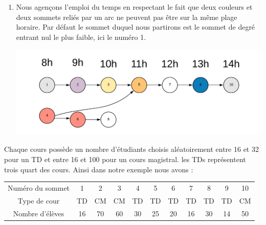 \documentclass[a4paper,11pt]{article}
\begin{document}
\begin{enumerate}
			\item Nous agençons l'emploi du temps en respectant le fait que deux couleurs et deux sommets reliés par un arc ne peuvent pas être sur la même plage horaire. Par défaut le sommet duquel nous partirons est le sommet de degré entrant nul le plus faible, ici le numéro 1.
			\centerline{\includegraphics[scale=0.8]{Captures/exemple4.png}}
		\end{enumerate}
		Chaque cours possède un nombre d'étudiants choisis aléatoirement entre 16 et 32 pour un TD et entre 16 et 100 pour un cours magistral. les TDs représentent trois quart des cours. Ainsi dans notre exemple nous avons : \\
		\begin{tabular}{ | c | c | c | c | c | c | c | c | c | c | c |}
 			\hline			
   			Numéro du sommet & 1 & 2 & 3 & 4 & 5 & 6 & 7 & 8 & 9 & 10\\
   			Type de cour & TD & CM & CM & TD & TD & TD & TD & TD & TD & CM \\
   			Nombre d'élèves & 16 & 70 & 60 & 30 & 25 & 20 & 16 & 30 & 14 & 50\\
 			\hline  
 		\end{tabular}\\
\end{document}
